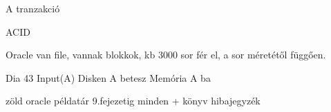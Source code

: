 A tranzakció

ACID


Oracle
van file, vannak blokkok, kb 3000 sor fér el, a sor méretétől függően.

Dia
43
Input(A)  Disken A betesz Memória A ba

zöld oracle példatár
9.fejezetig minden
+ könyv hibajegyzék

